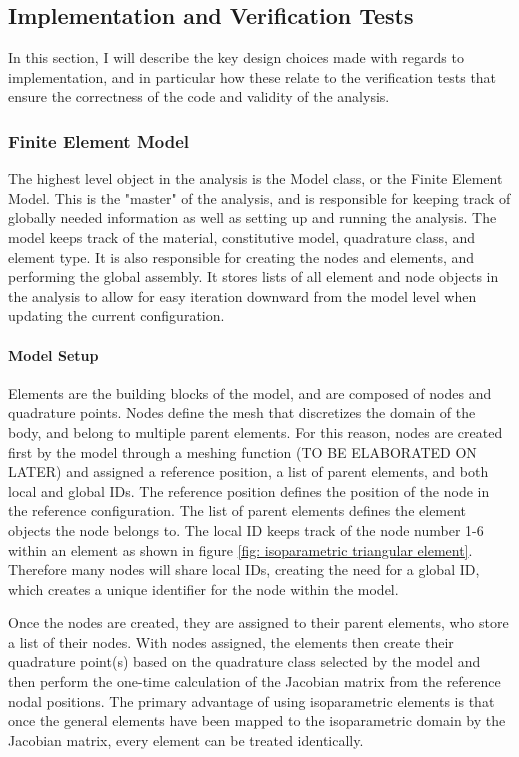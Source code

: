 \documentclass[]{spie}  %
\begin{document}
\subsection{Implementation and Verification Tests}
In this section, I will describe the key design choices made with regards to implementation, and in particular how these relate to the verification tests that ensure the correctness of the code and validity of the analysis. 

\subsubsection{Finite Element Model}
The highest level object in the analysis is the Model class, or the Finite Element Model. This is the "master" of the analysis, and is responsible for keeping track of globally needed information as well as setting up and running the analysis. The model keeps track of the material, constitutive model, quadrature class, and element type. It is also responsible for creating the nodes and elements, and performing the global assembly. It stores lists of all element and node objects in the analysis to allow for easy iteration downward from the model level when updating the current configuration. 

\paragraph{Model Setup}
Elements are the building blocks of the model, and are composed of nodes and quadrature points. Nodes define the mesh that discretizes the domain of the body, and belong to multiple parent elements. For this reason, nodes are created first by the model through a meshing function (TO BE ELABORATED ON LATER) and assigned a reference position, a list of parent elements, and both local and global IDs. The reference position defines the position of the node in the reference configuration. The list of parent elements defines the element objects the node belongs to. The local ID keeps track of the node number 1-6 within an element as shown in figure \ref{fig: isoparametric triangular element}. Therefore many nodes will share local IDs, creating the need for a global ID, which creates a unique identifier for the node within the model.

Once the nodes are created, they are assigned to their parent elements, who store a list of their nodes. With nodes assigned, the elements then create their quadrature point(s) based on the quadrature class selected by the model and then perform the one-time calculation of the Jacobian matrix from the reference nodal positions. The primary advantage of using isoparametric elements is that once the general elements have been mapped to the isoparametric domain by the Jacobian matrix, every element can be treated identically.
\end{document}
